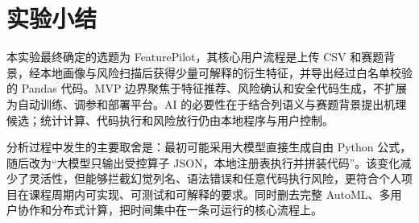 \documentclass[UTF8,12pt,a4paper]{ctexart}
\begin{document}
\clearpage
\section{实验小结}

本实验最终确定的选题为 FeaturePilot，其核心用户流程是上传 CSV 和赛题背景，经本地画像与风险扫描后获得少量可解释的衍生特征，并导出经过白名单校验的 Pandas 代码。MVP 边界聚焦于特征推荐、风险确认和安全代码生成，不扩展为自动训练、调参和部署平台。AI 的必要性在于结合列语义与赛题背景提出机理候选；统计计算、代码执行和风险放行仍由本地程序与用户控制。

分析过程中发生的主要取舍是：最初可能采用大模型直接生成自由 Python 公式，随后改为“大模型只输出受控算子 JSON，本地注册表执行并拼装代码”。该变化减少了灵活性，但能够拦截幻觉列名、语法错误和任意代码执行风险，更符合个人项目在课程周期内可实现、可测试和可解释的要求。同时删去完整 AutoML、多用户协作和分布式计算，把时间集中在一条可运行的核心流程上。
\end{document}

